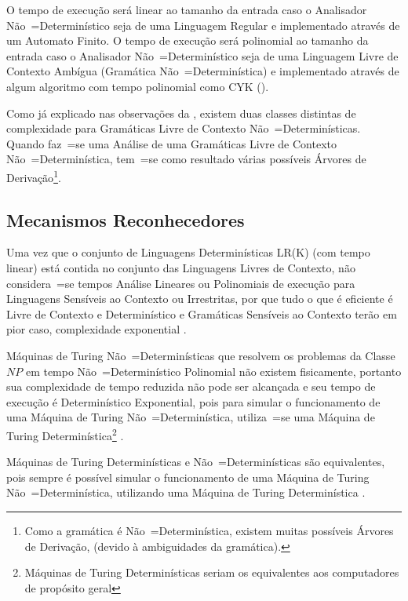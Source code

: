 O tempo de execução será linear ao tamanho da entrada caso o Analisador Não~=Determinístico seja de uma Linguagem Regular e
implementado através de um Automato Finito.
O tempo de execução será polinomial ao tamanho da entrada caso o Analisador Não~=Determinístico seja de uma Linguagem Livre de Contexto Ambígua (Gramática Não~=Determinística) e
implementado através de algum algoritmo com tempo polinomial como CYK ().

Como já explicado nas observações da ,
existem duas classes distintas de complexidade para Gramáticas Livre de Contexto Não~=Determinísticas.
Quando faz~=se uma Análise de uma Gramáticas Livre de Contexto Não~=Determinística,
tem~=se como resultado várias possíveis Árvores de Derivação\footnote{
Como a gramática é Não~=Determinística,
existem muitas possíveis Árvores de Derivação,
(devido à ambiguidades da gramática).
}.


\subsection{Mecanismos Reconhecedores}
\label{mecanismosReconhecedores}

Uma vez que o conjunto de Linguagens Determinísticas LR(K) (com tempo linear) está contida no conjunto das Linguagens Livres de Contexto,
não considera~=se tempos Análise Lineares ou
Polinomiais de execução para Linguagens Sensíveis ao Contexto ou
Irrestritas,
por que tudo o que é eficiente é Livre de Contexto e
Determinístico e
Gramáticas Sensíveis ao Contexto terão em pior caso,
complexidade exponential \cite{growingContextSensitiveLanguages}.

Máquinas de Turing Não~=Determinísticas que resolvem os problemas da Classe $NP$ em tempo Não~=Determinístico Polinomial não existem fisicamente,
portanto sua complexidade de tempo reduzida não pode ser alcançada e
seu tempo de execução é Determinístico Exponential,
pois para simular o funcionamento de uma Máquina de Turing Não~=Determinística,
utiliza~=se uma Máquina de Turing Determinística\footnote{
Máquinas de Turing Determinísticas seriam os equivalentes aos computadores de propósito geral
}
\cite{sipserBook,turingMachinesRoyer}.

Máquinas de Turing Determinísticas e
Não~=Determinísticas são equivalentes,
pois sempre é possível simular o funcionamento de uma Máquina de Turing Não~=Determinística,
utilizando uma Máquina de Turing Determinística \cite{hopcroftBook}.

